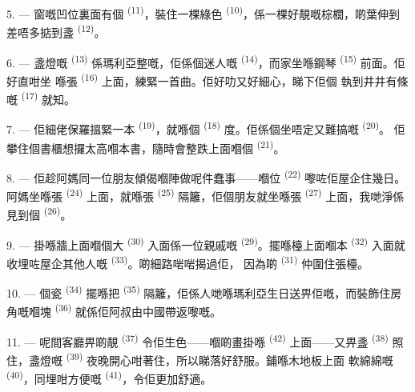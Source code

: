 5. --- 窗嘅凹位裏面有個 \textsuperscript{(11)}，裝住一棵綠色
 \textsuperscript{(10)}，係一棵好靚嘅棕櫚，啲葉伸到差唔多掂到盞
 \textsuperscript{(12)}。

6. --- 盞燈嘅 \textsuperscript{(13)} 係瑪利亞整嘅，佢係個迷人嘅
 \textsuperscript{(14)}，而家坐喺鋼琴 \textsuperscript{(15)} 前面。佢好直咁坐
喺張 \textsuperscript{(16)} 上面，練緊一首曲。佢好叻又好細心，睇下佢個
執到井井有條嘅 \textsuperscript{(17)} 就知。

\VUsaut{5.0mm}
\VUsaut{3.0mm}

7. --- 佢細佬保羅搵緊一本 \textsuperscript{(19)}，就喺個
\textsuperscript{(18)} 度。佢係個坐唔定又難搞嘅 \textsuperscript{(20)}。
佢攀住個書櫃想攞太高嗰本書，隨時會整跌上面嗰個 \textsuperscript{(21)}。

8. --- 佢趁阿媽同一位朋友傾偈嗰陣做呢件蠢事——嗰位 \textsuperscript{(22)}
嚟咗佢屋企住幾日。阿媽坐喺張 \textsuperscript{(24)} 上面，就喺張
 \textsuperscript{(25)} 隔籬，佢個朋友就坐喺張
\textsuperscript{(27)} 上面，我哋淨係見到個 \textsuperscript{(26)}。

9. --- 掛喺牆上面嗰個大 \textsuperscript{(30)} 入面係一位親戚嘅
 \textsuperscript{(29)}。擺喺檯上面嗰本 \textsuperscript{(32)}
入面就收埋咗屋企其他人嘅 \textsuperscript{(33)}。啲細路啱啱揭過佢，
因為啲 \textsuperscript{(31)} 仲圍住張檯。

10. --- 個瓷 \textsuperscript{(34)} 擺喺把
\textsuperscript{(35)} 隔籬，佢係人哋喺瑪利亞生日送畀佢嘅，而裝飾住房角嘅嗰塊
\textsuperscript{(36)} 就係佢阿叔由中國帶返嚟嘅。

11. --- 呢間客廳畀啲靚 \textsuperscript{(37)} 令佢生色——嗰啲畫掛喺
 \textsuperscript{(42)} 上面——又畀盞 \textsuperscript{(38)}
照住，盞燈嘅 \textsuperscript{(39)} 夜晚開心咁著住，所以睇落好舒服。鋪喺木地板上面
軟綿綿嘅 \textsuperscript{(40)}，同埋咁方便嘅
\textsuperscript{(41)}，令佢更加舒適。

\VUsaut{3.6mm}
\VUsaut{3.0mm}

